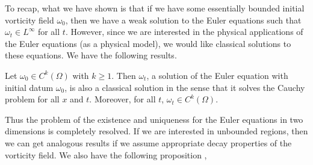 \documentclass{article}
\begin{document}
To recap, what we have shown is that if we have some essentially bounded initial vorticity field $\omega_{0}$, then we have a weak solution to the Euler equations such that $\omega_{t} \in L^{\infty}$ for all $t$. However, since we are interested in the physical applications of the Euler equations (as a physical model), we would like classical solutions to these equations. We have the following results. 
\begin{theorem}
	Let $\omega_{0} \in C^{k}(\Omega)$ with $k \geq 1$. Then $\omega_{t}$, a solution of the Euler equation with initial datum $\omega_{0}$, is also a classical solution in the sense that it solves the Cauchy problem for all $x$ and $t$. Moreover, for all $t$, $\omega_{t} \in C^{k}(\Omega)$. 
\end{theorem} 
Thus the problem of the existence and uniqueness for the Euler equations in two dimensions is completely resolved. If we are interested in unbounded regions, then we can get analogous results if we assume appropriate decay properties of the vorticity field. We also have the following proposition \cite{Majda_Bertozzi_2001}, 
\end{document}
